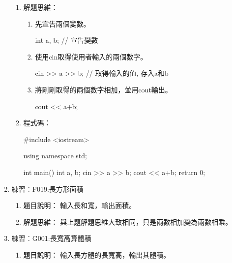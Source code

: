 \begin{enumerate}
\begin{enumerate}
			\item 解題思維：
			\begin{enumerate}
			\item 先宣告兩個變數。
			\begin{inside}
			int a, b; // 宣告變數
			\end{inside}
			\item 使用cin取得使用者輸入的兩個數字。
			\begin{inside}
			cin >> a >> b; // 取得輸入的值, 存入a和b
			\end{inside}
			\item 將剛剛取得的兩個數字相加，並用cout輸出。
			\begin{inside}
			cout << a+b;
			\end{inside}
			\end{enumerate} 
			
			\item 程式碼：
			\begin{cppcode}
				#include <iostream>
				
				using namespace std;
				
				int main()
				{
					int a, b;
					cin >> a >> b;
					cout << a+b;
					return 0;	
				}
			\end{cppcode}
		\end{enumerate}
		
	\item 練習︰F019:長方形面積%
		\begin{enumerate}
			\item 題目說明：
			\subitem 輸入長和寬，輸出面積。
			
			\item 解題思維：
			\subitem 與上題解題思維大致相同，只是兩數相加變為兩數相乘。

\begin{comment}			
			\item 程式碼：
			\begin{cppcode}
				#include <iostream>
				
				using namespace std;
				
				int main()
				{
					int a, b;
					cin >> a >> b;
					cout << a*b;
					return 0;	
				}
			\end{cppcode}
\end{comment}
		\end{enumerate}
		
	\item 練習︰G001:長寬高算體積
		\begin{enumerate}
			\item 題目說明：
			\subitem 輸入長方體的長寬高，輸出其體積。
			

\end{enumerate}
\end{enumerate}
